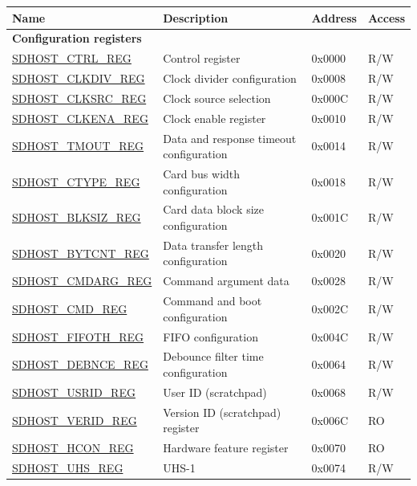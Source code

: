 \begin{longtable}{ | p{6cm} | p{7.0cm} | p{1.3cm} | p{1.2cm} | }
\hline\rowcolor{lightgray}
Name & Description &  Address & Access \\ \hline
\endhead
\multicolumn{4}{|l|}{\textbf{Configuration registers}} \\ \hline
\hyperref[regdesc:SDHOSTCTRLREG]{SDHOST\_CTRL\_REG} & Control register & 0x0000 & R/W \\ \hline
\hyperref[regdesc:SDHOSTCLKDIVREG]{SDHOST\_CLKDIV\_REG} & Clock divider configuration & 0x0008 & R/W \\ \hline
\hyperref[regdesc:SDHOSTCLKSRCREG]{SDHOST\_CLKSRC\_REG} & Clock source selection & 0x000C & R/W \\ \hline
\hyperref[regdesc:SDHOSTCLKENAREG]{SDHOST\_CLKENA\_REG} & Clock enable register & 0x0010 & R/W \\ \hline
\hyperref[regdesc:SDHOSTTMOUTREG]{SDHOST\_TMOUT\_REG} & Data and response timeout configuration & 0x0014 & R/W \\ \hline
\hyperref[regdesc:SDHOSTCTYPEREG]{SDHOST\_CTYPE\_REG} & Card bus width configuration & 0x0018 & R/W \\ \hline
\hyperref[regdesc:SDHOSTBLKSIZREG]{SDHOST\_BLKSIZ\_REG} & Card data block size configuration & 0x001C & R/W \\ \hline
\hyperref[regdesc:SDHOSTBYTCNTREG]{SDHOST\_BYTCNT\_REG} & Data transfer length configuration & 0x0020 & R/W \\ \hline
\hyperref[regdesc:SDHOSTCMDARGREG]{SDHOST\_CMDARG\_REG} & Command argument data & 0x0028 & R/W \\ \hline
\hyperref[regdesc:SDHOSTCMDREG]{SDHOST\_CMD\_REG} & Command and boot configuration & 0x002C & R/W \\ \hline
\hyperref[regdesc:SDHOSTFIFOTHREG]{SDHOST\_FIFOTH\_REG} & FIFO configuration & 0x004C & R/W \\ \hline
\hyperref[regdesc:SDHOSTDEBNCEREG]{SDHOST\_DEBNCE\_REG} & Debounce filter time configuration & 0x0064 & R/W \\ \hline
\hyperref[regdesc:SDHOSTUSRIDREG]{SDHOST\_USRID\_REG} & User ID (scratchpad) & 0x0068 & R/W \\ \hline
\hyperref[regdesc:VERIDREG]{SDHOST\_VERID\_REG} & Version ID (scratchpad) register & 0x{}006C & RO \\ \hline
\hyperref[regdesc:HCONREG]{SDHOST\_HCON\_REG} & Hardware feature register & 0x{}0070 & RO \\ \hline
\hyperref[regdesc:SDHOSTUHSREG]{SDHOST\_UHS\_REG} & UHS-1 & 0x0074 & R/W \\ \hline

\end{longtable}
